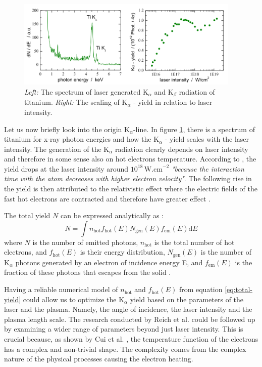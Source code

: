 \begin{figure}[h]
	\centering
	\includegraphics[width=0.95\textwidth]{figures/spectrum-ti}
	\caption{\textit{Left:} The spectrum of laser generated $\mathrm{K}_\alpha$ and $\mathrm{K}_\beta$ radiation of titanium. \textit{Right:} The scaling of $\mathrm{K}_\alpha$ - yield in relation to laser intensity. \cite{schwoerer2004}}
	\label{fig:ti-spectrum}
\end{figure}

Let us now briefly look into the origin $\mathrm{K}_\alpha$-line. In figure \ref{fig:ti-spectrum}, there is a spectrum of titanium for x-ray photon energies and how the $\mathrm{K}_\alpha$ - yield scales with the laser intensity. The generation of the $\mathrm{K}_\alpha$ radiation clearly depends on laser intensity and therefore in some sense also on hot electrons temperature. According to \cite{schwoerer2004}, the yield drops at the laser intensity around $10^{18}\,\mathrm{W.cm}^{-2}$ \textit{"because the interaction time with the atom decreases with higher electron velocity"}. The following rise in the yield is then attributed to the relativistic effect where the electric fields of the fast hot electrons are contracted and therefore have greater effect \cite{schwoerer2004}.

The total yield $N$ can be expressed analytically as \cite{reich2000}:
\begin{equation}
	N = \int n_\mathrm{hot} f_\mathrm{hot}(E) N_\mathrm{gen}(E) f_\mathrm{em}(E)\mathrm{d}E
	\label{eq:total-yield}
\end{equation}
where $N$ is the number of emitted photons, $n_\mathrm{hot}$ is the total number of hot electrons, and $f_\mathrm{hot}(E)$ is their energy distribution, $N_\mathrm{gen}(E)$ is the number of $\mathrm{K}_\alpha$ photons generated by an electron of incidence energy E, and $f_\mathrm{em}(E)$ is the fraction of these photons that escapes from the solid \cite{reich2000}. 

Having a reliable numerical model of $n_\mathrm{hot}$ and $f_\mathrm{hot}(E)$ from equation \ref{eq:total-yield} could allow us to optimize the $\mathrm{K}_\alpha$ yield based on the parameters of the laser and the plasma. Namely, the angle of incidence, the laser intensity and the plasma length scale. The research conducted by Reich et al. \cite{reich2000} could be followed up by examining a wider range of parameters beyond just laser intensity. This is crucial because, as shown by Cui et al. \cite{hot-electrons1}, the temperature function of the electrons has a complex and non-trivial shape. The complexity comes from the complex nature of the physical processes causing the electron heating.

